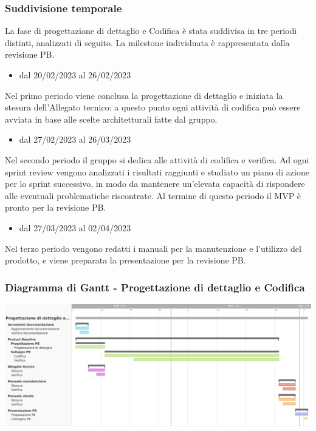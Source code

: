 \subsubsection{Suddivisione temporale}
La fase di progettazione di dettaglio e Codifica è stata suddivisa in tre periodi distinti, analizzati di seguito. La milestone individuata è rappresentata dalla revisione PB.

\begin{itemize}
    \item dal 20/02/2023 al 26/02/2023
\end{itemize}
Nel primo periodo viene conclusa la progettazione di dettaglio e iniziata la stesura dell’Allegato tecnico: a questo punto ogni attività di codifica può essere avviata in base alle scelte architetturali fatte dal gruppo.

\begin{itemize}
    \item dal 27/02/2023 al 26/03/2023
\end{itemize}
Nel secondo periodo il gruppo si dedica alle attività di codifica e verifica. Ad ogni sprint review vengono analizzati i risultati raggiunti e studiato un piano di azione per lo sprint successivo, in modo da mantenere un’elevata capacità di rispondere alle eventuali problematiche riscontrate. Al termine di questo periodo il MVP è pronto per la revisione PB.

\begin{itemize}
    \item dal 27/03/2023 al 02/04/2023
\end{itemize}
Nel terzo periodo vengono redatti i manuali per la manutenzione e l’utilizzo del prodotto, e viene preparata la presentazione per la revisione PB.

\subsubsection{Diagramma di Gantt - Progettazione di dettaglio e Codifica}
\includegraphics[width=\textwidth]{img/4_codifica.png}\\

